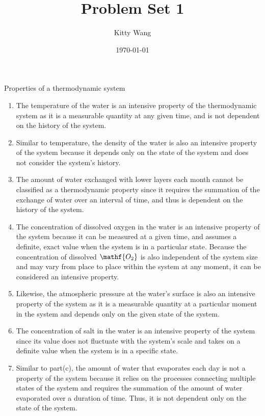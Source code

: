 \documentclass{homework}
\author{Kitty Wang}
\date{\today}
\title{Problem Set 1}
\begin{document}
 \maketitle

\question Properties of a thermodynamic system
\begin{enumerate}[label=(\alph*)]
\item The temperature of the water is an intensive property of the thermodynamic system as it is a measurable quantity at any given time, and is not dependent on the history of the system.
\item Similar to temperature, the density of the water is also an intensive property of the system because it depends only on the state of the system and does not consider the system’s history.
\item The amount of water exchanged with lower layers each month cannot be classified as a thermodynamic property since it requires the summation of the exchange of water over an interval of time, and thus is dependent on the history of the system.
\item The concentration of dissolved oxygen in the water is an intensive property of the system because it can be measured at a given time, and assumes a definite, exact value when the system is in a particular state. Because the concentration of dissolved $\mathf{O_2}$ is also independent of the system size and may vary from place to place within the system at any moment, it can be considered an intensive property.
\item Likewise, the atmospheric pressure at the water’s surface is also an intensive property of the system as it is a measurable quantity at a particular moment in the system and depends only on the given state of the system.
\item The concentration of salt in the water is an intensive property of the system since its value does not fluctuate with the system’s scale and takes on a definite value when the system is in a specific state.
\item Similar to part(c), the amount of water that evaporates each day is not a property of the system because it relies on the processes connecting multiple states of the system and requires the summation of the amount of water evaporated over a duration of time. Thus, it is not dependent only on the state of the system.
\end{enumerate}
\end{document}
